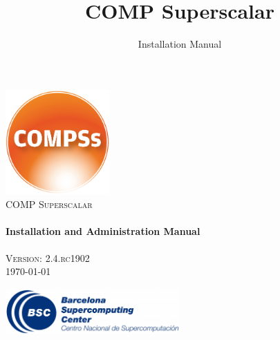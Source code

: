 \documentclass[a4paper,12pt]{article}
\title{COMP Superscalar}
\author{Installation Manual}
\def \compssversion {2.4.rc1902}
\begin{document}
  \hypersetup{pageanchor=false}
  \begin{titlepage} 
    \begin{center} 
      \includegraphics[width=0.3\textwidth]{./Figures/Logos/degradado-naranja-compss.jpg}~\\[1cm] 
      \textsc{\LARGE COMP Superscalar}\\[1.5cm] 
      
      \HRule \\[0.4cm] 
      { \huge \bfseries Installation and Administration Manual \\[0.4cm] }
      \HRule \\[1.5cm] 

      { \large \textsc{Version: \compssversion}} \\[0.3cm]
      { \large \today } 
      
      \vfill 
      \includegraphics[width=0.5\textwidth]{./Figures/bsc_280.jpg}~\\[1cm]
    \end{center} 
  \end{titlepage}
  \hypersetup{pageanchor=true}
  
\end{document}
